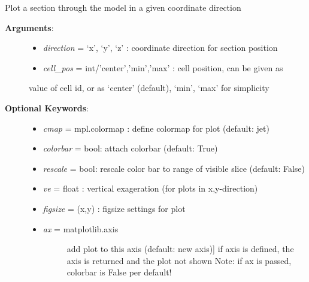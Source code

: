 \documentclass[letterpaper,10pt,english]{sphinxmanual}
\begin{document}
\begin{fulllineitems}
\begin{fulllineitems}
\end{fulllineitems}


\begin{fulllineitems}
\label{pygeomod:pygeomod.geogrid.GeoGrid.plot_section}
Plot a section through the model in a given coordinate direction
\begin{description}
\item[{\textbf{Arguments}:}] \leavevmode\begin{itemize}
\item {} 
\emph{direction} = `x', `y', `z' : coordinate direction for section position

\item {} 
\emph{cell\_pos} = int/'center','min','max' : cell position, can be given as

\end{itemize}

value of cell id, or as `center' (default), `min', `max' for simplicity

\item[{\textbf{Optional Keywords}:}] \leavevmode\begin{itemize}
\item {} 
\emph{cmap} = mpl.colormap : define colormap for plot (default: jet)

\item {} 
\emph{colorbar} = bool: attach colorbar (default: True)

\item {} 
\emph{rescale} = bool: rescale color bar to range of visible slice (default: False)

\item {} 
\emph{ve} = float : vertical exageration (for plots in x,y-direction)

\item {} 
\emph{figsize} = (x,y) : figsize settings for plot

\item {} \begin{description}
\item[{\emph{ax} = matplotlib.axis}] \leavevmode{[}add plot to this axis (default: new axis){]}
if axis is defined, the axis is returned and the plot not shown
Note: if ax is passed, colorbar is False per default!

\end{description}


\end{itemize}
\end{description}
\end{fulllineitems}
\end{fulllineitems}
\end{document}
